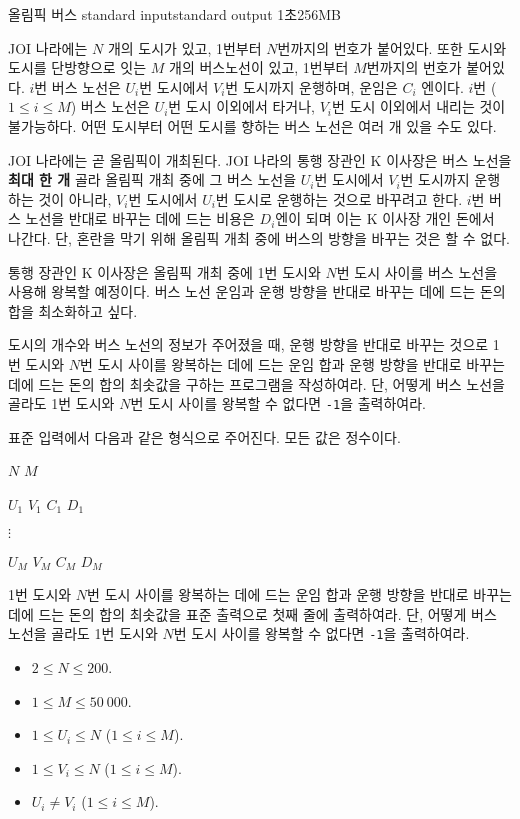 \begin{problem}{올림픽 버스}
	{standard input}{standard output}
	{1초}{256MB}{}
	
	JOI 나라에는 $N$ 개의 도시가 있고, 1번부터 $N$번까지의 번호가 붙어있다. 또한 도시와 도시를 단방향으로 잇는 $M$ 개의 버스노선이 있고, 1번부터 $M$번까지의 번호가 붙어있다. $i$번 버스 노선은 $U_i$번 도시에서 $V_i$번 도시까지 운행하며, 운임은 $C_i$ 엔이다. $i$번 ($1 \le i \le M$) 버스 노선은 $U_i$번 도시 이외에서 타거나, $V_i$번 도시 이외에서 내리는 것이 불가능하다. 어떤 도시부터 어떤 도시를 향하는 버스 노선은 여러 개 있을 수도 있다.
	
	JOI 나라에는 곧 올림픽이 개최된다. JOI 나라의 통행 장관인 K 이사장은 버스 노선을 \textbf{최대 한 개} 골라 올림픽 개최 중에 그 버스 노선을 $U_i$번 도시에서 $V_i$번 도시까지 운행하는 것이 아니라, $V_i$번 도시에서 $U_i$번 도시로 운행하는 것으로 바꾸려고 한다. $i$번 버스 노선을 반대로 바꾸는 데에 드는 비용은 $D_i$엔이 되며 이는 K 이사장 개인 돈에서 나간다. 단, 혼란을 막기 위해 올림픽 개최 중에 버스의 방향을 바꾸는 것은 할 수 없다.
	
	통행 장관인 K 이사장은 올림픽 개최 중에 1번 도시와 $N$번 도시 사이를 버스 노선을 사용해 왕복할 예정이다. 버스 노선 운임과 운행 방향을 반대로 바꾸는 데에 드는 돈의 합을 최소화하고 싶다.
	
	도시의 개수와 버스 노선의 정보가 주어졌을 때, 운행 방향을 반대로 바꾸는 것으로 1번 도시와 $N$번 도시 사이를 왕복하는 데에 드는 운임 합과 운행 방향을 반대로 바꾸는 데에 드는 돈의 합의 최솟값을 구하는 프로그램을 작성하여라. 단, 어떻게 버스 노선을 골라도 1번 도시와 $N$번 도시 사이를 왕복할 수 없다면 \texttt{-1}을 출력하여라.
	
	
	\InputFile
	
	표준 입력에서 다음과 같은 형식으로 주어진다. 모든 값은 정수이다.

	$N$ $M$
	
	$U_1$ $V_1$ $C_1$ $D_1$
	
	$\vdots$
	
	$U_M$ $V_M$ $C_M$ $D_M$
	
	\OutputFile
	
	1번 도시와 $N$번 도시 사이를 왕복하는 데에 드는 운임 합과 운행 방향을 반대로 바꾸는 데에 드는 돈의 합의 최솟값을 표준 출력으로 첫째 줄에 출력하여라. 단, 어떻게 버스 노선을 골라도 1번 도시와 $N$번 도시 사이를 왕복할 수 없다면 \texttt{-1}을 출력하여라.
	
	
	\Constraints
	
	\begin{itemize}
	\item $2 \le N \le 200$.
	\item $1 \le M \le 50\ 000$.
	\item $1 \le U_i \le N$ ($1 \le i \le M$).
	\item $1 \le V_i \le N$ ($1 \le i \le M$).
	\item $U_i \ne V_i$ ($1 \le i \le M$).


\end{itemize}
\end{problem}
